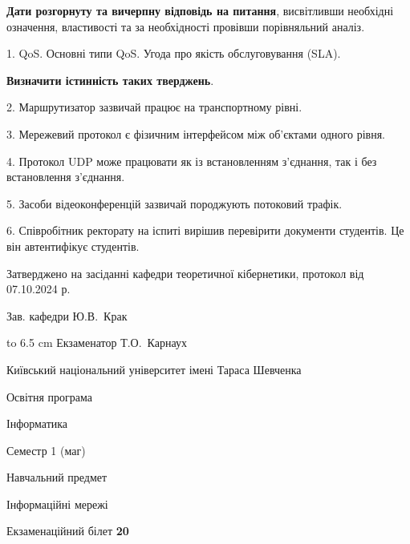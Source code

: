 \documentclass[12pt, ukrainian]{article}
\begin{document}
{
\qquad\textbf{Дати розгорнуту та вичерпну відповідь на питання}, висвітливши необхідні означення, властивості та за необхідності провівши порівняльний аналіз.

1. QoS. Основні типи QoS. Угода про якість обслуговування (SLA).



\qquad\textbf{Визначити істинність таких тверджень}.

2. Маршрутизатор зазвичай працює на транспортному рівні.


3. Мережевий протокол є фізичним інтерфейсом між об'єктами одного рівня.


4. Протокол UDP може працювати як із встановленням з'єднання, так і без встановлення з'єднання.


5. Засоби відеоконференцій зазвичай породжують потоковий трафік.


6. Співробітник ректорату на іспиті вирішив перевірити документи студентів. Це він автентифікує студентів.

}
{\smallskip\smallskip \begin {scriptsize} Затверджено на засіданні кафедри теоретичної кібернетики, протокол   від   07.10.2024 р.\par\smallskip\smallskip\smallskip\smallskip
{\parbox {6.5 cm} {Зав. кафедри \dotfill Ю.В.~Крак}}\hspace {0.7cm} {\hbox to 6.5 cm { Екзаменатор \dotfill Т.О.~Карнаух}} \end{scriptsize}}
\vspace{0.9cm}
{{\begin {scriptsize}\par
{ \center  Київський національний університет імені Тараса Шевченка \par}
{\parbox {5 cm}{Освітня програма \hfill}{\parbox {7 cm}{Інформатика\hfill}}\parbox {6 cm}{\hfill Семестр 1 (маг)}}\par
{\parbox {5 cm} {Навчальний предмет \hfill}\parbox {7 cm}{Інформаційні мережі \hfill}\parbox {6cm}{\hfill}\par}\vspace{-15pt} \end{scriptsize}}{\center Екзаменаційний білет \No \textbf { 20 }\par}}
\end{document}
